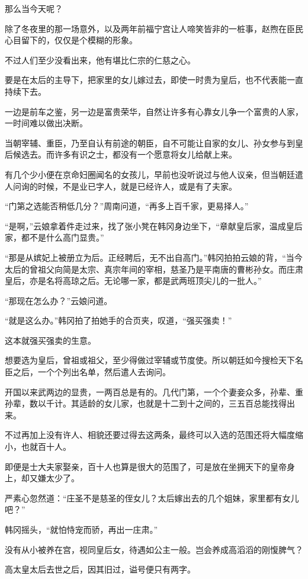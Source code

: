 那么当今天呢？

除了冬夜里的那一场意外，以及两年前福宁宫让人啼笑皆非的一桩事，赵煦在臣民心目留下的，仅仅是个模糊的形象。

不过人们至少没看出来，他有堪比仁宗的仁慈之心。

要是在太后的主导下，把家里的女儿嫁过去，即使一时贵为皇后，也不代表能一直持续下去。

一边是前车之鉴，另一边是富贵荣华，自然让许多有心靠女儿争一个富贵的人家，一时间难以做出决断。

当朝宰辅、重臣，乃至自认有前途的朝臣，自不可能让自家的女儿、孙女参与到皇后候选去。而许多有识之士，都没有一个愿意将女儿给献上来。

有几个少小便在京命妇圈闻名的女孩儿，早前也没听说过与他人议亲，但当朝廷遣人问询的时候，不是业已字人，就是已经许人，或是有了夫家。

“门第之选能否稍低几分？”周南问道，“再多上百千家，更易择人。”

“是啊，”云娘拿着件走过来，找了张小凳在韩冈身边坐下，“章献皇后家，温成皇后家，都不是什么高门显贵。”

“那是从嫔妃上被册立为后。正经聘后，无不出自高门。”韩冈拍拍云娘的背，“当今太后的曾祖父向简是太宗、真宗年间的宰相，慈圣乃是平南唐的曹彬孙女。而庄肃皇后，亦是名将高琼之后。无论哪一家，都是武两班顶尖儿的一批人。”

“那现在怎么办？”云娘问道。

“就是这么办。”韩冈拍了拍她手的合页夹，叹道，“强买强卖！”

这本就强买强卖的生意。

想要选为皇后，曾祖或祖父，至少得做过宰辅或节度使。所以朝廷如今搜检天下名臣之后，一个个列出名单，然后遣人去询问。

开国以来武两边的显贵，一两百总是有的。几代门第，一个个妻妾众多，孙辈、重孙辈，数以千计。其适龄的女儿家，也就是十二到十之间的，三五百总能找得出来。

不过再加上没有许人、相貌还要过得去这两条，最终可以入选的范围还将大幅度缩小，也就百十人。

即便是士大夫家娶亲，百十人也算是很大的范围了，可是放在坐拥天下的皇帝身上，却又嫌太少了。

严素心忽然道：“庄圣不是慈圣的侄女儿？太后嫁出去的几个姐妹，家里都有女儿吧？”

韩冈摇头，“就怕恃宠而骄，再出一庄肃。”

没有从小被养在宫，视同皇后女，待遇如公主一般。岂会养成高滔滔的刚愎脾气？

高太皇太后去世之后，因其旧过，谥号便只有两字。

